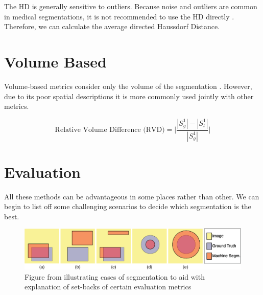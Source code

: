\documentclass[11pt,twoside]{report}
\begin{document}
The HD is generally sensitive to outliers. Because noise and outliers are common in medical segmentations, it is not recommended to use the HD directly \cite{boundary-overlap-metrics}. Therefore, we can calculate the average directed Haussdorf Distance.


\section{Volume Based}

Volume-based metrics consider only the volume of the segmentation \cite{evaluation-of-metrics-in-prostate,review-metrics, boundary-overlap-metrics}. However, due to its poor spatial descriptions it is more commonly used jointly with other metrics.

\begin{equation*}
  \text{Relative Volume Difference (RVD)} = \bigg| \frac{|S_g^1|-|S_t^1|}{|S_g^1|}\bigg|
\end{equation*}

\section{Evaluation}\label{sect:evaluation-of-evaluation-methods}

All these methods can be advantageous in some places rather than other. We can begin to list off some challenging scenarios to decide which segmentation is the best.

\begin{figure}[H]
  \centering
  \includegraphics[width=\linewidth]{../figures/segmentation-cases-1.png}
  \caption{Figure from \cite{boundary-overlap-metrics} illustrating cases of segmentation to aid with explanation of set-backs of certain evaluation metrics}
  \label{fig:segmentation-cases-1}
\end{figure}
\end{document}
